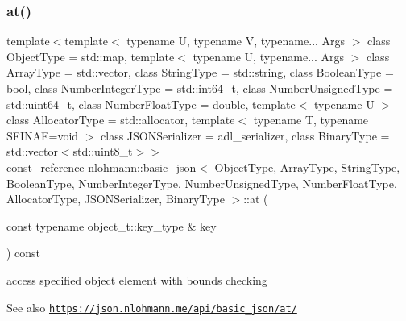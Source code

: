 \subsubsection{\texorpdfstring{at()}{at()}\hspace{0.1cm}{\footnotesize\ttfamily [4/6]}}
{\footnotesize\ttfamily template$<$template$<$ typename U, typename V, typename... Args $>$ class Object\+Type = std\+::map, template$<$ typename U, typename... Args $>$ class Array\+Type = std\+::vector, class String\+Type  = std\+::string, class Boolean\+Type  = bool, class Number\+Integer\+Type  = std\+::int64\+\_\+t, class Number\+Unsigned\+Type  = std\+::uint64\+\_\+t, class Number\+Float\+Type  = double, template$<$ typename U $>$ class Allocator\+Type = std\+::allocator, template$<$ typename T, typename S\+F\+I\+N\+A\+E=void $>$ class J\+S\+O\+N\+Serializer = adl\+\_\+serializer, class Binary\+Type  = std\+::vector$<$std\+::uint8\+\_\+t$>$$>$ \\
\hyperlink{classnlohmann_1_1basic__json_ab8a1c33ee7b154fc41ca2545aa9724e6}{const\+\_\+reference} \hyperlink{classnlohmann_1_1basic__json}{nlohmann\+::basic\+\_\+json}$<$ Object\+Type, Array\+Type, String\+Type, Boolean\+Type, Number\+Integer\+Type, Number\+Unsigned\+Type, Number\+Float\+Type, Allocator\+Type, J\+S\+O\+N\+Serializer, Binary\+Type $>$\+::at (\begin{DoxyParamCaption}\item[{const typename object\+\_\+t\+::key\+\_\+type \&}]{key }\end{DoxyParamCaption}) const\hspace{0.3cm}{\ttfamily [inline]}}



access specified object element with bounds checking 

\begin{DoxySeeAlso}{See also}
\href{https://json.nlohmann.me/api/basic_json/at/}{\tt https\+://json.\+nlohmann.\+me/api/basic\+\_\+json/at/} 
\end{DoxySeeAlso}
\mbox{\label{classnlohmann_1_1basic__json_aa014a978f8b6c085db8825faa8dad320}} 
